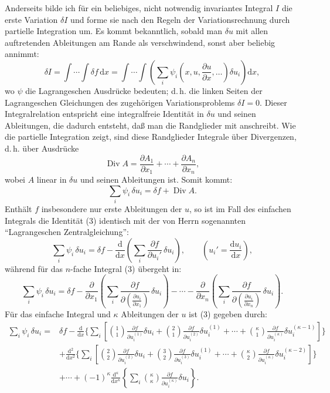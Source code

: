 \documentclass[11pt]{article}
\providecommand{\dd}{\mathrm d}
\providecommand{\Div}{\operatorname{Div}}
\providecommand{\p}{\partial}
\providecommand{\p}{\partial}
\providecommand{\dd}{\mathrm d}
\begin{document}
Anderseits bilde ich für ein beliebiges, nicht notwendig invariantes Integral \(I\) die erste Variation \(\delta I\) und forme sie nach den Regeln der Variationsrechnung durch partielle Integration um. Es kommt bekanntlich, sobald man \(\delta u\) mit allen auftretenden Ableitungen am Rande als verschwindend, sonst aber beliebig annimmt:
\begin{equation}
\delta I=\int\!\cdots\!\int \delta f\,\dd x
=\int\!\cdots\!\int\left(\sum_i\psi_i\!\left(x,u,\frac{\p u}{\p x},\ldots\right)\delta u_i\right)\dd x,
\tag{2}
\end{equation}
wo \(\psi\) die Lagrangeschen Ausdrücke bedeuten; d.\,h. die linken Seiten der Lagrangeschen Gleichungen des zugehörigen Variationsproblems \(\delta I=0\). Dieser Integralrelation entspricht eine integralfreie Identität in \(\delta u\) und seinen Ableitungen, die dadurch entsteht, daß man die Randglieder mit anschreibt. Wie die partielle Integration zeigt, sind diese Randglieder Integrale über Divergenzen, d.\,h. über Ausdrücke
\[
\Div A=\frac{\p A_1}{\p x_1}+\cdots+\frac{\p A_n}{\p x_n},
\]
wobei \(A\) linear in \(\delta u\) und seinen Ableitungen ist. Somit kommt:
\begin{equation}
\sum_i\psi_i\,\delta u_i=\delta f+\Div A.
\tag{3}
\end{equation}
Enthält \(f\) insbesondere nur erste Ableitungen der \(u\), so ist im Fall des einfachen Integrals die Identität (3) identisch mit der von Herrn sogenannten ``Lagrangeschen Zentralgleichung'':
\begin{equation}
\sum_i \psi_i\,\delta u_i
=\delta f-\frac{\dd}{\dd x}\left(\sum_i\frac{\p f}{\p u_i'}\,\delta u_i\right),
\qquad \left(u_i'=\frac{\dd u_i}{\dd x}\right),
\tag{4}
\end{equation}
während für das \(n\)-fache Integral (3) übergeht in:
\begin{equation}
\sum_i\psi_i\,\delta u_i
=
\delta f
-\frac{\p}{\p x_1}\left(\sum_i\frac{\p f}{\p \left(\frac{\p u_i}{\p x_1}\right)}\,\delta u_i\right)
-\cdots
-\frac{\p}{\p x_n}\left(\sum_i\frac{\p f}{\p \left(\frac{\p u_i}{\p x_n}\right)}\,\delta u_i\right).
\tag{5}
\end{equation}
Für das einfache Integral und \(\kappa\) Ableitungen der \(u\) ist (3) gegeben durch:
\begin{equation}
\begin{aligned}
\sum_i\psi_i\,\delta u_i
={}&\delta f
-\frac{\dd}{\dd x}\Bigg\{\sum_i\left[
\binom{1}{1}\frac{\p f}{\p u_i^{(1)}}\delta u_i
+\binom{2}{1}\frac{\p f}{\p u_i^{(2)}}\delta u_i^{(1)}
+\cdots+
\binom{\kappa}{1}\frac{\p f}{\p u_i^{(\kappa)}}\delta u_i^{(\kappa-1)}
\right]\Bigg\}\\
&+\frac{\dd^2}{\dd x^2}\Bigg\{\sum_i\left[
\binom{2}{2}\frac{\p f}{\p u_i^{(2)}}\delta u_i
+\binom{3}{2}\frac{\p f}{\p u_i^{(3)}}\delta u_i^{(1)}
+\cdots+
\binom{\kappa}{2}\frac{\p f}{\p u_i^{(\kappa)}}\delta u_i^{(\kappa-2)}
\right]\Bigg\}\\
&+\cdots
+(-1)^\kappa\frac{\dd^\kappa}{\dd x^\kappa}
\left\{\sum_i\binom{\kappa}{\kappa}
\frac{\p f}{\p u_i^{(\kappa)}}\delta u_i\right\}.
\end{aligned}
\tag{6}
\end{equation}
\end{document}
